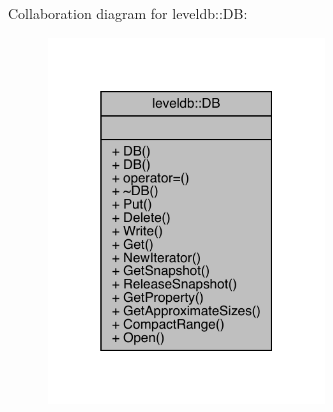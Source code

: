 Collaboration diagram for leveldb\+::DB\+:
\nopagebreak
\begin{figure}[H]
\begin{center}
\leavevmode
\includegraphics[width=208pt]{classleveldb_1_1_d_b__coll__graph}
\end{center}
\end{figure}
